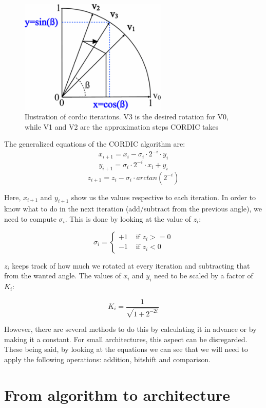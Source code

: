 \documentclass[12pt, a4paper,oneside]{article}
\begin{document}
\begin{figure}[h]
	\centering
	\includegraphics[width = 7cm]{cordic_iterations.png}
	\caption{Ilustration of cordic iterations. V3 is the desired rotation for V0,
	while V1 and V2 are the approximation steps CORDIC takes}
	\label{fig:cordic_iterations}
\end{figure}

The generalized equations of the CORDIC algorithm are:
\[ x_{i+1} = x_i - \sigma_i \cdot 2^{-i} \cdot y_i \]
\[ y_{i+1} = \sigma_i \cdot 2^{-i} \cdot x_i + y_i\]
\[ z_{i+1} = z_i - \sigma_i \cdot arctan(2^{-i}) \]


Here, $x_{i+1}$ and $y_{i+1}$ show us the values respective to each iteration.
In order to know what to do in the next iteration (add/subtract from the previous
angle), we need to compute $\sigma_i$. This is done by looking at the value of 
$z_i$:

$$
\sigma_i = \left\{ \begin{array}{rl}
 +1 &\mbox{ if $z_i>=0$} \\
 -1 &\mbox{ if $z_i<0$}
       \end{array} \right.
$$

$z_i$ keeps track of how much we rotated at every iteration and subtracting that 
from the wanted angle.
The values of $x_i$ and $y_i$ need to be scaled by a factor of $K_i$:

$$K_i = \frac{1}{\sqrt{1 + 2^{-2i}}}$$

However, there are several methods to do this by calculating it in advance or by 
making it a constant. For small architectures, this aspect can be disregarded.
\\
These being said, by looking at the equations we can see that we will need 
to apply the following operations: addition, bitshift and comparison.

\section{From algorithm to architecture}
\end{document}

